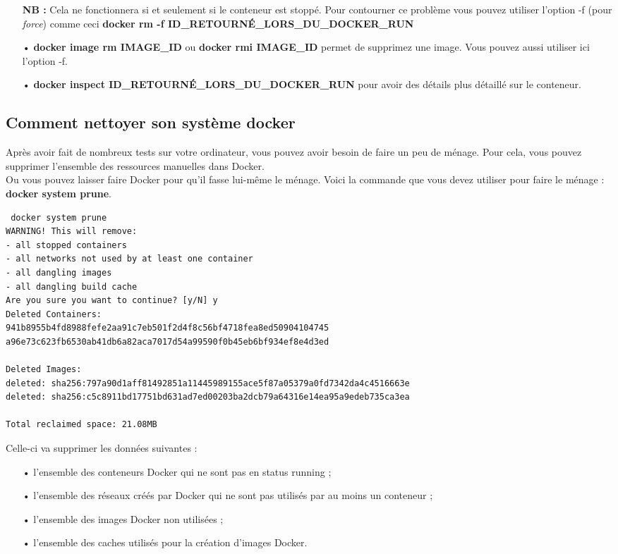 \documentclass[12pt,a4paper]{article}
\begin{document}
\begin{itemize}
\textbf{NB : } Cela ne fonctionnera si et seulement si le conteneur est stoppé. Pour 
contourner ce problème vous pouvez utiliser l'option -f (pour \textit{force}) comme ceci
\textbf{docker rm -f ID\_RETOURNÉ\_LORS\_DU\_DOCKER\_RUN} 
\item[•] \textbf{docker image rm IMAGE\_ID} ou \textbf{docker rmi IMAGE\_ID} permet 
de supprimez une image. Vous pouvez aussi utiliser ici l'option -f.
\item[•] \textbf{docker inspect ID\_RETOURNÉ\_LORS\_DU\_DOCKER\_RUN} pour avoir
des détails plus détaillé sur le conteneur.
\end{itemize}

\subsection{Comment nettoyer son système docker}
Après avoir fait de nombreux tests sur votre ordinateur, vous pouvez avoir besoin de faire un peu de ménage. Pour cela, vous pouvez supprimer l'ensemble des ressources manuelles dans Docker.\\
Ou vous pouvez laisser faire Docker pour qu'il fasse lui-même le ménage. Voici la commande que vous devez utiliser pour faire le ménage :  \textbf{docker system prune}.\\
\begin{verbatim}
 docker system prune
WARNING! This will remove:
- all stopped containers
- all networks not used by at least one container
- all dangling images
- all dangling build cache
Are you sure you want to continue? [y/N] y
Deleted Containers:
941b8955b4fd8988fefe2aa91c7eb501f2d4f8c56bf4718fea8ed50904104745
a96e73c623fb6530ab41db6a82aca7017d54a99590f0b45eb6bf934ef8e4d3ed

Deleted Images:
deleted: sha256:797a90d1aff81492851a11445989155ace5f87a05379a0fd7342da4c4516663e
deleted: sha256:c5c8911bd17751bd631ad7ed00203ba2dcb79a64316e14ea95a9edeb735ca3ea

Total reclaimed space: 21.08MB
\end{verbatim}
Celle-ci va supprimer les données suivantes :
\begin{itemize}
\item[•] l'ensemble des conteneurs Docker qui ne sont pas en status running ;
\item[•] l'ensemble des réseaux créés par Docker qui ne sont pas utilisés par au moins un conteneur ;
\item[•] l'ensemble des images Docker non utilisées ;
\item[•] l'ensemble des caches utilisés pour la création d'images Docker.
\end{itemize}
\end{document}
